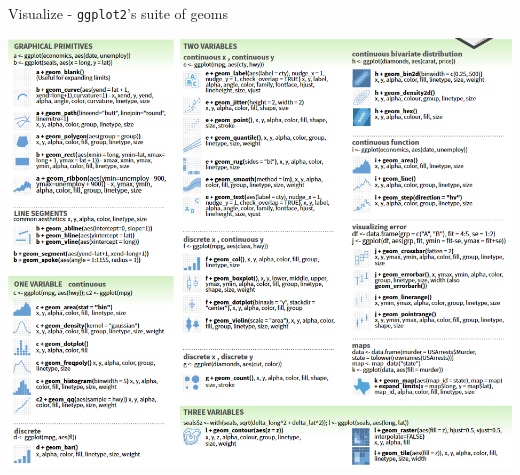 \documentclass[
  ignorenonframetext,
]{beamer}
\begin{document}
\begin{frame}{Visualize - \texttt{ggplot2}'s suite of geoms}
\protect\hypertarget{visualize---ggplot2s-suite-of-geoms}{}
\begin{center}\includegraphics[width=13.11in,height=1\textheight]{images/geoms} \end{center}
\end{frame}
\end{document}
